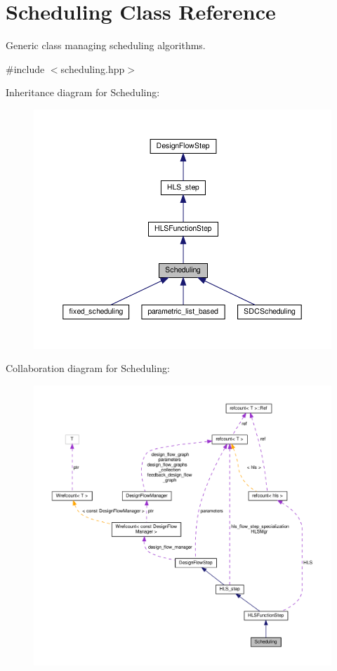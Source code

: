 \hypertarget{classScheduling}{}\section{Scheduling Class Reference}
\label{classScheduling}


Generic class managing scheduling algorithms.  




{\ttfamily \#include $<$scheduling.\+hpp$>$}



Inheritance diagram for Scheduling\+:
\nopagebreak
\begin{figure}[H]
\begin{center}
\leavevmode
\includegraphics[width=350pt]{d8/dfb/classScheduling__inherit__graph}
\end{center}
\end{figure}


Collaboration diagram for Scheduling\+:
\nopagebreak
\begin{figure}[H]
\begin{center}
\leavevmode
\includegraphics[width=350pt]{d1/dba/classScheduling__coll__graph}
\end{center}
\end{figure}
